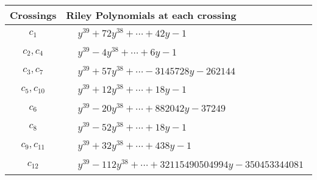 \documentclass[1p]{elsarticle_modified}
\theoremstyle{definition}
\begin{document}
\begin{tabular}{m{50pt}|m{274pt}}
Crossings & \hspace{64pt}Riley Polynomials at each crossing \\
\hline $$\begin{aligned}c_{1}\end{aligned}$$&$\begin{aligned}
&y^{39}+72 y^{38}+\cdots+42 y-1
\end{aligned}$\\
\hline $$\begin{aligned}c_{2},c_{4}\end{aligned}$$&$\begin{aligned}
&y^{39}-4 y^{38}+\cdots+6 y-1
\end{aligned}$\\
\hline $$\begin{aligned}c_{3},c_{7}\end{aligned}$$&$\begin{aligned}
&y^{39}+57 y^{38}+\cdots-3145728 y-262144
\end{aligned}$\\
\hline $$\begin{aligned}c_{5},c_{10}\end{aligned}$$&$\begin{aligned}
&y^{39}+12 y^{38}+\cdots+18 y-1
\end{aligned}$\\
\hline $$\begin{aligned}c_{6}\end{aligned}$$&$\begin{aligned}
&y^{39}-20 y^{38}+\cdots+882042 y-37249
\end{aligned}$\\
\hline $$\begin{aligned}c_{8}\end{aligned}$$&$\begin{aligned}
&y^{39}-52 y^{38}+\cdots+18 y-1
\end{aligned}$\\
\hline $$\begin{aligned}c_{9},c_{11}\end{aligned}$$&$\begin{aligned}
&y^{39}+32 y^{38}+\cdots+438 y-1
\end{aligned}$\\
\hline $$\begin{aligned}c_{12}\end{aligned}$$&$\begin{aligned}
&y^{39}-112 y^{38}+\cdots+32115490504994 y-350453344081
\end{aligned}$\\
\hline
\end{tabular}\\~\\
\end{document}
